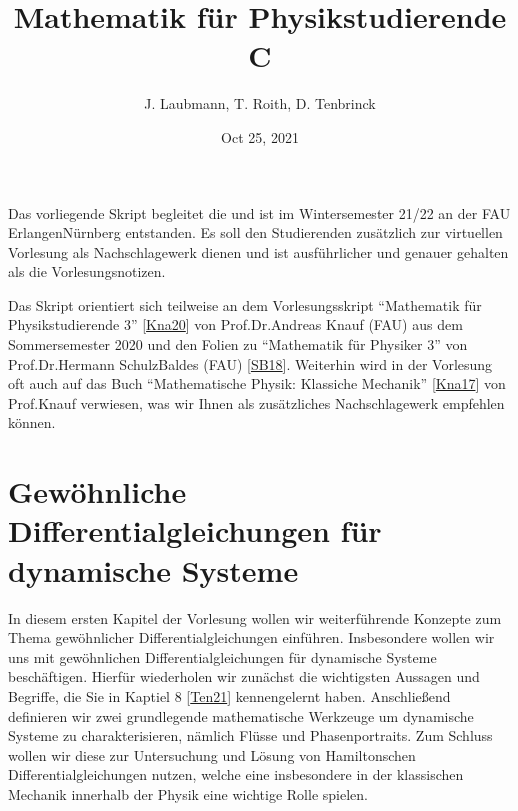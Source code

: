 \documentclass[letterpaper,10pt,english]{jupyterBook}
\title{Mathematik für Physikstudierende C}
\date{Oct 25, 2021}
\author{J.\@{} Laubmann, T.\@{} Roith, D.\@{} Tenbrinck}
\begin{document}
\pagestyle{empty}
\sphinxmaketitle
\pagestyle{plain}
\sphinxtableofcontents
\pagestyle{normal}
\label{\detokenize{intro::doc}}


\noindent{}

\sphinxAtStartPar
Das vorliegende Skript begleitet die  und ist im Wintersemester 21/22 an der FAU Erlangen\sphinxhyphen{}Nürnberg entstanden. Es soll den Studierenden zusätzlich zur virtuellen Vorlesung als Nachschlagewerk dienen und ist ausführlicher und genauer gehalten als die Vorlesungsnotizen.

\begin{DUlineblock}{0em}
\item[] 
\end{DUlineblock}

\sphinxAtStartPar
Das Skript orientiert sich teilweise an dem Vorlesungsskript “Mathematik für Physikstudierende 3” {[}\hyperlink{cite.references:id6}{Kna20}{]} von Prof.Dr.Andreas Knauf (FAU) aus dem Sommersemester 2020 und den Folien zu “Mathematik für Physiker 3” von Prof.Dr.Hermann Schulz\sphinxhyphen{}Baldes (FAU) {[}\hyperlink{cite.references:id8}{SB18}{]}. Weiterhin wird in der Vorlesung oft auch auf das Buch “Mathematische Physik: Klassiche Mechanik” {[}\hyperlink{cite.references:id7}{Kna17}{]} von Prof.Knauf verwiesen, was wir Ihnen als zusätzliches Nachschlagewerk empfehlen können.


\chapter{Gewöhnliche Differentialgleichungen für dynamische Systeme}
\label{\detokenize{ode/ode:gewohnliche-differentialgleichungen-fur-dynamische-systeme}}\label{\detokenize{ode/ode::doc}}
\sphinxAtStartPar
In diesem ersten Kapitel der Vorlesung wollen wir weiterführende Konzepte zum Thema gewöhnlicher Differentialgleichungen einführen.
Insbesondere wollen wir uns mit gewöhnlichen Differentialgleichungen für dynamische Systeme beschäftigen.
Hierfür wiederholen wir zunächst die wichtigsten Aussagen und Begriffe, die Sie in Kaptiel 8 {[}\hyperlink{cite.references:id10}{Ten21}{]} kennengelernt haben.
Anschließend definieren wir zwei grundlegende mathematische Werkzeuge um dynamische Systeme zu charakterisieren, nämlich Flüsse und Phasenportraits.
Zum Schluss wollen wir diese zur Untersuchung und Lösung von Hamiltonschen Differentialgleichungen nutzen, welche eine insbesondere in der klassischen Mechanik innerhalb der Physik eine wichtige Rolle spielen.
\end{document}
